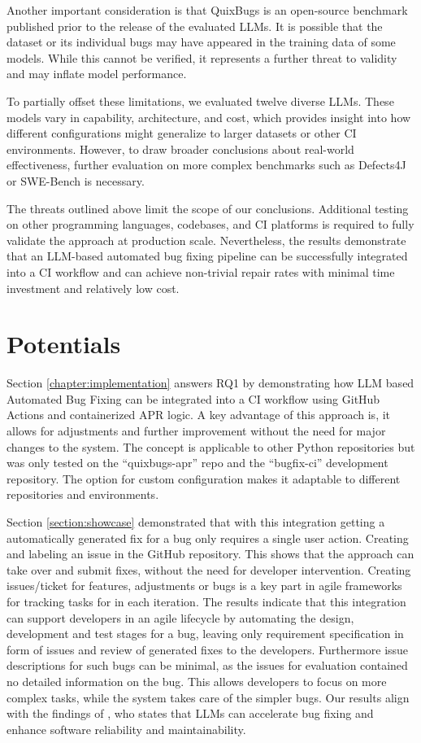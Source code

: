 Another important consideration is that QuixBugs is an open-source benchmark published prior to the release of the evaluated LLMs. It is possible that the dataset or its individual bugs may have appeared in the training data of some models. While this cannot be verified, it represents a further threat to validity and may inflate model performance.

To partially offset these limitations, we evaluated twelve diverse LLMs. These models vary in capability, architecture, and cost, which provides insight into how different configurations might generalize to larger datasets or other CI environments. However, to draw broader conclusions about real-world effectiveness, further evaluation on more complex benchmarks such as Defects4J or SWE-Bench is necessary.

The threats outlined above limit the scope of our conclusions. Additional testing on other programming languages, codebases, and CI platforms is required to fully validate the approach at production scale. Nevertheless, the results demonstrate that an LLM-based automated bug fixing pipeline can be successfully integrated into a CI workflow and can achieve non-trivial repair rates with minimal time investment and relatively low cost.

\section{Potentials}

Section \ref{chapter:implementation} answers RQ1 by demonstrating how LLM based Automated Bug Fixing can be integrated into a CI workflow using GitHub Actions and containerized APR logic. A key advantage of this approach is, it allows for adjustments and further improvement without the need for major changes to the system.
The concept is applicable to other Python repositories but was only tested on the ``quixbugs-apr'' repo and the ``bugfix-ci'' development repository. The option for custom configuration makes it adaptable to different repositories and environments.

Section \ref{section:showcase} demonstrated that with this integration getting a automatically generated fix for a bug only requires a single user action. Creating and labeling an issue in the GitHub repository. This shows that the approach can take over and submit fixes, without the need for developer intervention. Creating issues/ticket for features, adjustments or bugs is a key part in agile frameworks for tracking tasks for in each iteration. %
The results indicate that this integration can support developers in an agile lifecycle by automating the design, development and test stages for a bug, leaving only requirement specification in form of issues and review of generated fixes to the developers. Furthermore issue descriptions for such bugs can be minimal, as the issues for evaluation contained no detailed information on the bug. This allows developers to focus on more complex tasks, while the system takes care of the simpler bugs. Our results align with the findings of \cite{houLargeLanguageModels2024}, who states that LLMs can accelerate bug fixing and enhance software reliability and maintainability.

